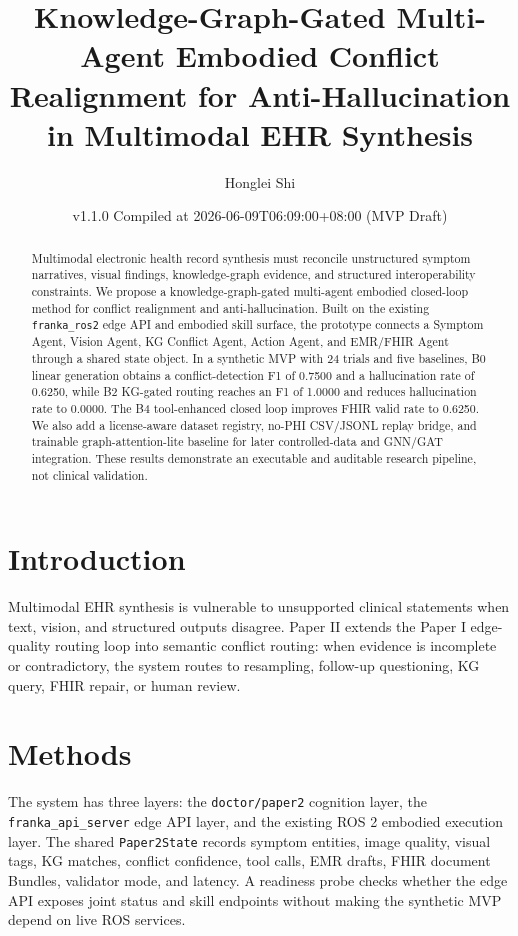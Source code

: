 \documentclass[11pt]{article}
\title{Knowledge-Graph-Gated Multi-Agent Embodied Conflict Realignment for Anti-Hallucination in Multimodal EHR Synthesis}
\author{Honglei Shi}
\date{v1.1.0 Compiled at 2026-06-09T06:09:00+08:00 (MVP Draft)}
\begin{document}
\maketitle

\begin{abstract}
Multimodal electronic health record synthesis must reconcile unstructured symptom narratives, visual findings, knowledge-graph evidence, and structured interoperability constraints. We propose a knowledge-graph-gated multi-agent embodied closed-loop method for conflict realignment and anti-hallucination. Built on the existing \texttt{franka\_ros2} edge API and embodied skill surface, the prototype connects a Symptom Agent, Vision Agent, KG Conflict Agent, Action Agent, and EMR/FHIR Agent through a shared state object. In a synthetic MVP with 24 trials and five baselines, B0 linear generation obtains a conflict-detection F1 of 0.7500 and a hallucination rate of 0.6250, while B2 KG-gated routing reaches an F1 of 1.0000 and reduces hallucination rate to 0.0000. The B4 tool-enhanced closed loop improves FHIR valid rate to 0.6250. We also add a license-aware dataset registry, no-PHI CSV/JSONL replay bridge, and trainable graph-attention-lite baseline for later controlled-data and GNN/GAT integration. These results demonstrate an executable and auditable research pipeline, not clinical validation.
\end{abstract}

\section{Introduction}
Multimodal EHR synthesis is vulnerable to unsupported clinical statements when text, vision, and structured outputs disagree. Paper II extends the Paper I edge-quality routing loop into semantic conflict routing: when evidence is incomplete or contradictory, the system routes to resampling, follow-up questioning, KG query, FHIR repair, or human review.

\section{Methods}
The system has three layers: the \texttt{doctor/paper2} cognition layer, the \texttt{franka\_api\_server} edge API layer, and the existing ROS 2 embodied execution layer. The shared \texttt{Paper2State} records symptom entities, image quality, visual tags, KG matches, conflict confidence, tool calls, EMR drafts, FHIR document Bundles, validator mode, and latency. A readiness probe checks whether the edge API exposes joint status and skill endpoints without making the synthetic MVP depend on live ROS services.
\end{document}
